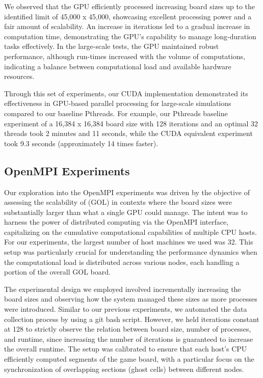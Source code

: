 \documentclass[11pt,twocolumn]{article}
\begin{document}
We observed that the GPU efficiently processed increasing board sizes up to the identified limit of 45,000 x 45,000, showcasing excellent processing power and a fair amount of scalability. An increase in iterations led to a gradual increase in computation time, demonstrating the GPU's capability to manage long-duration tasks effectively. In the large-scale tests, the GPU maintained robust performance, although run-times increased with the volume of computations, indicating a balance between computational load and available hardware resources.

Through this set of experiments, our CUDA implementation demonstrated its effectiveness in GPU-based parallel processing for large-scale simulations compared to our baseline Pthreads. For example, our Pthreads baseline experiment of a 16,384 x 16,384 board size with 128 iterations and an optimal 32 threads took 2 minutes and 11 seconds, while the CUDA equivalent experiment took 9.3 seconds (approximately 14 times faster).

\subsection{OpenMPI Experiments}

Our exploration into the OpenMPI experiments was driven by the objective of assessing the scalability of (GOL) in contexts where the board sizes were substantially larger than what a single GPU could manage. The intent was to harness the power of distributed computing via the OpenMPI interface, capitalizing on the cumulative computational capabilities of multiple CPU hosts. For our experiments, the largest number of host machines we used was 32. This setup was particularly crucial for understanding the performance dynamics when the computational load is distributed across various nodes, each handling a portion of the overall GOL board.

The experimental design we employed involved incrementally increasing the board sizes and observing how the system managed these sizes as more processes were introduced. Similar to our previous experiments, we automated the data collection process by using a git bash script. However, we held iterations constant at 128 to strictly observe the relation between board size, number of processes, and runtime, since increasing the number of iterations is guaranteed to increase the overall runtime. The setup was calibrated to ensure that each host's CPU efficiently computed segments of the game board, with a particular focus on the synchronization of overlapping sections (ghost cells) between different nodes. 
\end{document}
